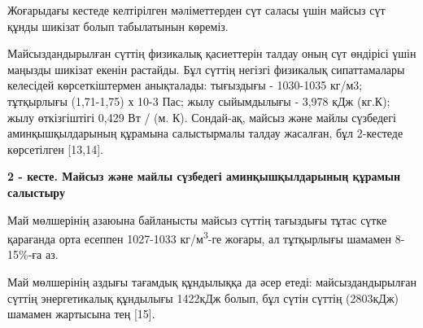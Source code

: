 {Жоғарыдағы кестеде келтірілген мәліметтерден сүт саласы үшін майсыз сүт
құнды шикізат болып табылатынын көреміз.

Майсыздандырылған сүттің физикалық қасиеттерін талдау оның сүт өндірісі
үшін маңызды шикізат екенін растайды. Бұл сүттің негізгі физикалық
сипаттамалары келесідей көрсеткіштермен анықталады: тығыздығы -
1030-1035 кг/м3; тұтқырлығы (1,71-1,75) х 10-3 Пас; жылу сыйымдылығы -
3,978 кДж (кг.К); жылу өткізгіштігі 0,429 Вт / (м. К). Сондай-ақ, майсыз
және майлы сүзбедегі аминқышқылдарының құрамына салыстырмалы талдау
жасалған, бұл 2-кестеде көрсетілген {[}13,14{]}.

{\bfseries 2 - кесте. Майсыз және майлы сүзбедегі аминқышқылдарының құрамын
салыстыру}


Май мөлшерінің азаюына байланысты майсыз сүттің тағыздығы тұтас сүтке
қарағанда орта есеппен 1027-1033 кг/м\textsuperscript{3}-ге жоғары, ал
тұтқырлығы шамамен 8-15\%-ға аз.

Май мөлшерінің аздығы тағамдық құндылыққа да әсер етеді:
майсыздандырылған сүттің энергетикалық құндылығы 1422кДж болып, бұл
сүтін сүттің (2803кДж) шамамен жартысына тең {[}15{]}.

}
